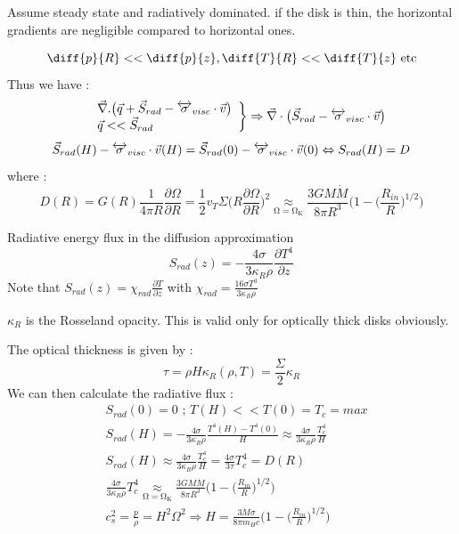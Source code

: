 \documentclass[10pt,a4paper,english]{article}
\let\originalleft\left
\let\originalright\right
\renewcommand{\left}{\mathopen{}\mathclose\bgroup\originalleft}
\renewcommand{\right}{\aftergroup\egroup\originalright}
\begin{document}
Assume steady state and radiatively dominated. if the disk is thin, the horizontal gradients
are negligible compared to horizontal ones.

\begin{equation}
    \diff{p}{R} << \diff{p}{z}, \diff{T}{R} << \diff{T}{z}\text{  etc}
\end{equation}
Thus we have :
\begin{equation}
    \left.
    \begin{array}{ll}
        & \vec{\nabla}.\big( \vec{q}+\vec{S}_{rad}-\tens{\sigma}_{visc}\cdot\vec{v}\big)\\
        & \vec{q} << \vec{S}_{rad}
    \end{array}
\right \}\Rightarrow \vec{\nabla}\cdot\big(\vec{S}_{rad}-\tens{\sigma}_{visc}\cdot\vec{v}\big)
\end{equation}
\begin{equation}
    \vec{S}_{rad}(H) - \overleftrightarrow{\sigma}_{visc}\cdot\vec{v}(H) = \vec{S}_{rad}(0) - \overleftrightarrow{\sigma}_{visc}\cdot\vec{v}(0) \Leftrightarrow
    S_{rad}(H) = D
\end{equation}
where :
\begin{equation}
    D(R) = G(R)\frac{1}{4\pi R}\frac{\partial \Omega}{\partial R } =
    \frac{1}{2}v_T \Sigma\bigg(   R\frac{\partial \Omega}{\partial R }\bigg)^2 \underset{\mathrm{\Omega = \Omega_K}}{\approx}
    \frac{3GM\dot{M}}{8\pi R^3}\Bigg( 1-\bigg(\frac{R_{in}}{R}\bigg)^{1/2}\Bigg)
\end{equation}

Radiative energy flux in the diffusion approximation
\begin{equation}
    S_{rad}(z) = -\frac{4\sigma}{3\kappa_R \rho}\frac{\partial T^4}{\partial	z}
\end{equation}
Note that $\displaystyle S_{rad}(z) = \chi_{rad} \frac{\partial T }{\partial z } $ with $\displaystyle\chi_{rad} = \frac{16 \sigma T^3}{3\kappa_R \rho}$

$\kappa_R$ is the Rosseland opacity. This is valid only for optically thick disks obviously.

The optical thickness is given by :
\begin{equation}
    \tau = \rho H \kappa_R(\rho ,T) = \frac{\Sigma}{2} \kappa_R
\end{equation}
We can then calculate the radiative flux :
\begin{align}
    & S_{rad}(0) = 0 \text{  ;  } T(H)<<T(0) = T_c = max  \\
    & S_{rad}(H) = -\frac{4\sigma}{3\kappa_R \rho}\frac{T^4(H)-T^4(0)}{H}
    \approx   \frac{4\sigma}{3\kappa_R \rho}\frac{T^4_c}{H} \\
    & S_{rad}(H) \approx  \frac{4\sigma}{3\kappa_R \rho}\frac{T^4_c}{H} =
    \frac{4\sigma}{3\tau}T_c^4 = D(R) \\
    & \frac{4\sigma}{3\kappa_R \rho}T^4_c\underset{\mathrm{\Omega = \Omega_K}}{\approx}
    \frac{3GM\dot{M}}{8\pi R^3}\bigg(  1-\bigg(\frac{R_{in}}{R}\bigg)^{1/2}\bigg) \\
    &c_s^2 = \frac{p}{\rho} = H^2\Omega^2 \Rightarrow H = \frac{3\dot{M}\sigma}{8\pi m_H c }
    \bigg(  1-\bigg(\frac{R_{in}}{R}\bigg)^{1/2} \bigg)
\end{align}
\end{document}
